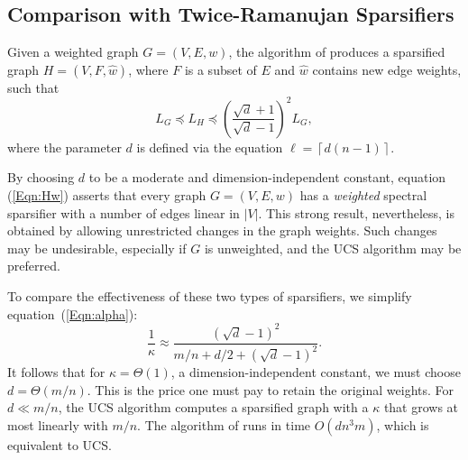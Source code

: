 \documentclass[final,leqno,onefignum,onetabnum]{siamltex1213}
\begin{document}
\subsection{Comparison with Twice-Ramanujan Sparsifiers}
Given a weighted graph $G = \left(V,E, w \right)$, the algorithm of \cite{ramanujansparse} produces a sparsified graph $H = \left(V,F, \widehat{w} \right)$, where $F$ is a subset of $E$ and $\widehat{w}$ contains new edge weights, such that 
\begin{equation}\label{Eqn:Hw}
{\displaystyle L_G \preceq L_{H} \preceq \left(\frac{\sqrt{d}+1}{\sqrt{d}-1}\right)^2 L_G ,}
\end{equation}
where the parameter $d$ is defined via the equation $\ell = \left\lceil
d\left(n-1\right)\right\rceil$. 

By choosing $d$ to be a moderate and dimension-independent constant,
equation (\ref{Eqn:Hw}) asserts that every graph $G = \left(V,E, w
\right)$ has a \emph{weighted} spectral sparsifier with a number of
edges linear in $|V|$. This strong result, nevertheless, is obtained by
allowing unrestricted changes in the graph weights.  Such changes may be undesirable, especially if $G$ is unweighted, and the UCS algorithm may be preferred.

To compare the effectiveness of these two types of sparsifiers, we 
simplify equation~(\ref{Eqn:alpha}):
\[{\displaystyle \frac{1}{\kappa} \approx
\frac{\left(\sqrt{d}-1\right)^2}{m/n+d/2+\left(\sqrt{d}-1\right)^2}. } 
\]
It follows that for ${\kappa} = \Theta(1)$, a
dimension-independent constant, we must choose $d = \Theta(m/n)$. This
is the price one must pay to retain the original weights. For $d \ll
m/n$, the UCS algorithm computes a sparsified graph with
a $\kappa$ that grows at most linearly with $m/n$.  The algorithm of \cite{ramanujansparse} runs in time $O\left(dn^3m\right)$, which is equivalent to UCS.
\end{document}
